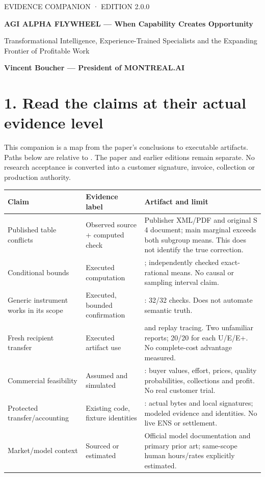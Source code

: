 \documentclass[10pt]{article}
\begin{document}
{\sffamily\small\color{teal}EVIDENCE COMPANION · EDITION 2.0.0}
\vspace{3mm}

{\sffamily\bfseries\fontsize{21}{25}\selectfont\color{navy}AGI ALPHA FLYWHEEL — When Capability Creates Opportunity\par}
\vspace{2mm}
{\sffamily Transformational Intelligence, Experience-Trained Specialists and the Expanding Frontier of Profitable Work\par}
\textbf{Vincent Boucher — President of MONTREAL.AI}

\section*{1. Read the claims at their actual evidence level}

This companion is a map from the paper's conclusions to executable artifacts. Paths below are relative to . The paper and earlier editions remain separate. No research acceptance is converted into a customer signature, invoice, collection or production authority.

\begin{tabularx}{\textwidth}{>{\raggedright\arraybackslash}p{}>{\raggedright\arraybackslash}p{}Y}
\toprule Claim & Evidence label & Artifact and limit\\\midrule
Published table conflicts & Observed source + computed check & Publisher XML/PDF and original S 4 document; main marginal exceeds both subgroup means. This does not identify the true correction.\\
Conditional bounds & Executed computation & ; independently checked exact-rational means. No causal or sampling interval claim.\\
Generic instrument works in its scope & Executed, bounded confirmation & : 32/32 checks. Does not automate semantic truth.\\
Fresh recipient transfer & Executed artifact use &  and replay tracing. Two unfamiliar reports; 20/20 for each U/E/E+. No complete-cost advantage measured.\\
Commercial feasibility & Assumed and simulated & : buyer values, effort, prices, quality probabilities, collections and profit. No real customer trial.\\
Protected transfer/accounting & Existing code, fixture identities & : actual bytes and local signatures; modeled evidence and identities. No live ENS or settlement.\\
Market/model context & Sourced or estimated & Official model documentation and primary prior art; same-scope human hours/rates explicitly estimated.\\\bottomrule
\end{tabularx}
\end{document}
